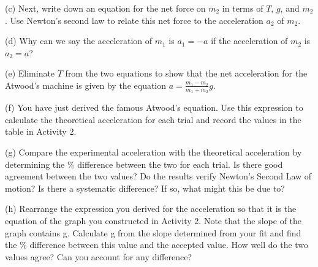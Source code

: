 (c) Next, write down an equation for the net force on \( m_{2} \) in terms
of $T$, $g$, and \( m_{2} \). Use Newton's second law to relate this net force
to the acceleration \( a_{2} \) of \( m_{2} \). 
\vspace{20mm}

(d) Why can we say the acceleration of \( m_{1} \) is \( a_{1} = -a\) if
the acceleration of \( m_{2} \) is \( a_{2} = a\)?
\vspace{20mm}

(e) Eliminate $T$ from the two equations to show that the net acceleration for
the Atwood's machine is given by the equation \( a=\frac{m_{1}-m_{2}}{m_{1}+m_{2}}g \). 
\vspace{40mm}

(f) You have just derived the famous Atwood's equation. Use this expression
to calculate the theoretical acceleration for each trial and record the values
in the table in Activity 2.

(g) Compare the experimental acceleration with the theoretical acceleration
by determining the \% difference between the two for each trial. Is there good
agreement between the two values? Do the results verify Newton's Second Law
of motion? Is there a systematic difference? If so, what might this be due to?
\vspace{20mm}

(h) Rearrange the expression you derived for the acceleration so that it is
the equation of the graph you constructed in Activity 2. Note that the slope
of the graph contains g. Calculate g from the slope determined from your fit
and find the \% difference between this value and the accepted value. How well
do the two values agree? Can you account for any difference?

